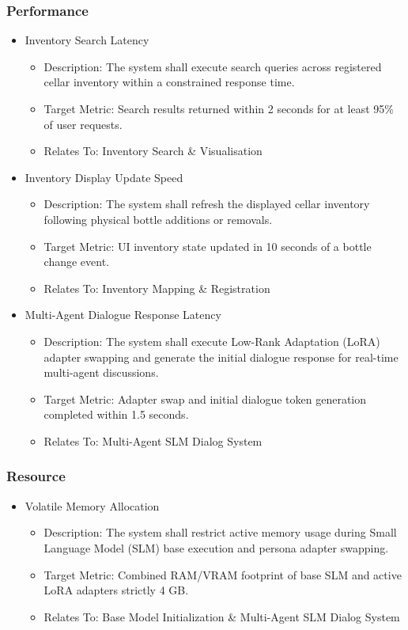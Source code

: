 \documentclass[conference]{IEEEtran}
\begin{document}
\subsubsection{Performance}
\begin{itemize}
    \item Inventory Search Latency
    \begin{itemize}
        \item Description: The system shall execute search queries across registered cellar inventory within a constrained response time.
        \item Target Metric: Search results returned within 2 seconds for at least 95\% of user requests.
        \item Relates To: Inventory Search \& Visualisation
    \end{itemize}

    \item Inventory Display Update Speed
    \begin{itemize}
        \item Description: The system shall refresh the displayed cellar inventory following physical bottle additions or removals.
        \item Target Metric: UI inventory state updated in 10 seconds of a bottle change event.
        \item Relates To: Inventory Mapping \& Registration
    \end{itemize}

    \item Multi-Agent Dialogue Response Latency
    \begin{itemize}
        \item Description: The system shall execute Low-Rank Adaptation (LoRA) adapter swapping and generate the initial dialogue response for real-time multi-agent discussions.
        \item Target Metric: Adapter swap and initial dialogue token generation completed within 1.5 seconds.
        \item Relates To: Multi-Agent SLM Dialog System
    \end{itemize}
\end{itemize}

\subsubsection{Resource}
\begin{itemize}
    \item Volatile Memory Allocation
    \begin{itemize}
        \item Description: The system shall restrict active memory usage during Small Language Model (SLM) base execution and persona adapter swapping.
        \item Target Metric: Combined RAM/VRAM footprint of base SLM and active LoRA adapters strictly 4 GB.
        \item Relates To: Base Model Initialization \& Multi-Agent SLM Dialog System
    \end{itemize}
\end{itemize}
\end{document}
